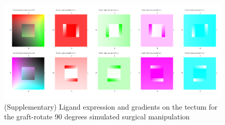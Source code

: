 \documentclass[11pt, a4paper]{article}
\begin{document}

\begin{figure}
\includegraphics[width=\linewidth]{./images/Tissuevisb.png}
\caption{(Supplementary) Ligand expression and gradients on the tectum for the
graft-rotate 90 degrees simulated surgical manipulation}
\label{f:trot90}
\end{figure}

%
\end{document}
